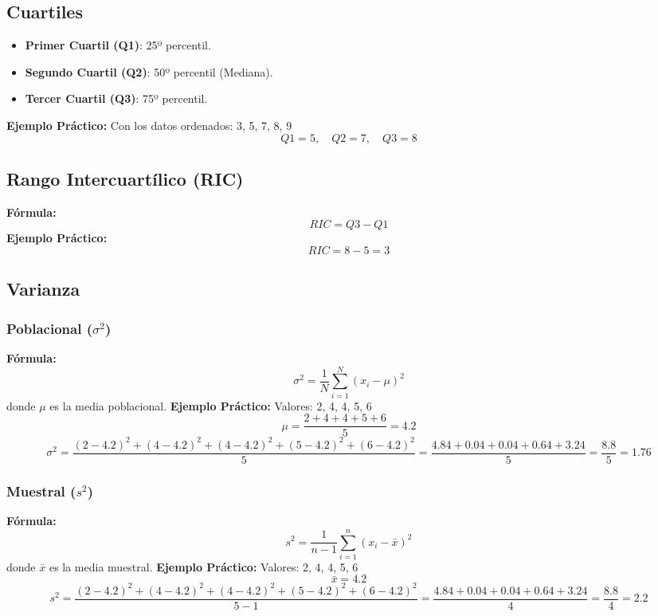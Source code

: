 \documentclass[10pt]{article}
\begin{document}
\begin{multicols}{2}
		\subsection*{Cuartiles}
		\begin{itemize}
			\item \textbf{Primer Cuartil (Q1)}: 25º percentil.
			\item \textbf{Segundo Cuartil (Q2)}: 50º percentil (Mediana).
			\item \textbf{Tercer Cuartil (Q3)}: 75º percentil.
		\end{itemize}
		\textbf{Ejemplo Práctico:}  
		Con los datos ordenados: 3, 5, 7, 8, 9  
		\[
		Q1 = 5, \quad Q2 = 7, \quad Q3 = 8
		\]
		
		\subsection*{Rango Intercuartílico (RIC)}
		\textbf{Fórmula:}
		\[
		RIC = Q3 - Q1
		\]
		\textbf{Ejemplo Práctico:}  
		\[
		RIC = 8 - 5 = 3
		\]
		
	\end{multicols}
	
	
	\newpage
	
	\subsection*{Varianza}
	
	\subsubsection*{Poblacional ($\sigma^2$)}
	\textbf{Fórmula:}
	\[
	\sigma^2 = \frac{1}{N} \sum_{i=1}^{N} (x_i - \mu)^2
	\]
	donde \( \mu \) es la media poblacional.
	\textbf{Ejemplo Práctico:}  
	Valores: 2, 4, 4, 5, 6  
	\[
	\mu = \frac{2 + 4 + 4 + 5 + 6}{5} = 4.2
	\]
	\[
	\sigma^2 = \frac{(2-4.2)^2 + (4-4.2)^2 + (4-4.2)^2 + (5-4.2)^2 + (6-4.2)^2}{5} = \frac{4.84 + 0.04 + 0.04 + 0.64 + 3.24}{5} = \frac{8.8}{5} = 1.76
	\]
	
	\subsubsection*{Muestral ($s^2$)}
	\textbf{Fórmula:}
	\[
	s^2 = \frac{1}{n-1} \sum_{i=1}^{n} (x_i - \bar{x})^2
	\]
	donde \( \bar{x} \) es la media muestral.
	\textbf{Ejemplo Práctico:}  
	Valores: 2, 4, 4, 5, 6  
	\[
	\bar{x} = 4.2
	\]
	\[
	s^2 = \frac{(2-4.2)^2 + (4-4.2)^2 + (4-4.2)^2 + (5-4.2)^2 + (6-4.2)^2}{5-1} = \frac{4.84 + 0.04 + 0.04 + 0.64 + 3.24}{4} = \frac{8.8}{4} = 2.2
	\]
	
\end{document}
